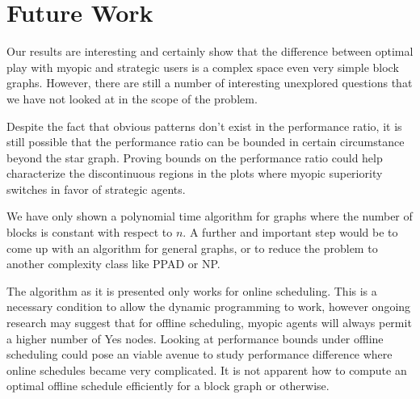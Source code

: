 \documentclass{article}
\begin{document}
\section{Future Work}

Our results are interesting and certainly show that the difference
between optimal play with myopic and strategic users is a complex
space even very simple block graphs. However, there are still a number
of interesting unexplored questions that we have not looked at in the
scope of the problem.

Despite the fact that obvious patterns don't exist in the performance
ratio, it is still possible that the performance ratio can be bounded
in certain circumstance beyond the star graph. Proving bounds on the
performance ratio could help characterize the discontinuous regions in
the plots where myopic superiority switches in favor of strategic
agents.

We have only shown a polynomial time algorithm for graphs where the
number of blocks is constant with respect to $n$. A further and
important step would be to come up with an algorithm for general
graphs, or to reduce the problem to another complexity class like PPAD
or NP.

The algorithm as it is presented only works for online
scheduling. This is a necessary condition to allow the dynamic
programming to work, however ongoing research may suggest that for
offline scheduling, myopic agents will always permit a higher number
of Yes nodes. Looking at performance bounds under offline scheduling
could pose an viable avenue to study performance difference where
online schedules became very complicated. It is not apparent how to
compute an optimal offline schedule efficiently for a block graph or
otherwise.



\end{document}
